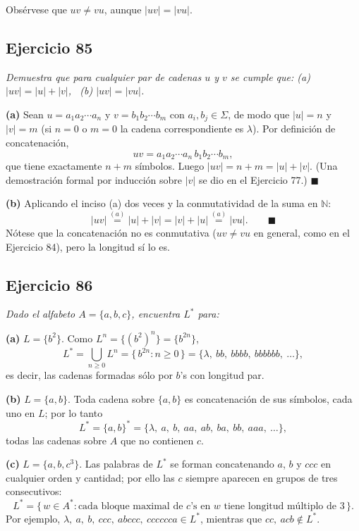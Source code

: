 \noindent Obsérvese que $uv \neq vu$, aunque $|uv| = |vu|$.

\subsection*{Ejercicio 85}

\noindent\textit{Demuestra que para cualquier par de cadenas $u$ y $v$ se cumple
    que: (a) $|uv| = |u| + |v|$, \ (b) $|uv| = |vu|$.}

\medskip
\noindent\textbf{(a)} Sean $u = a_1 a_2 \cdots a_n$ y $v = b_1 b_2 \cdots b_m$ con
$a_i, b_j \in \Sigma$, de modo que $|u| = n$ y $|v| = m$ (si $n = 0$ o $m = 0$ la
cadena correspondiente es $\lambda$). Por definición de concatenación,
\[
uv = a_1 a_2 \cdots a_n\, b_1 b_2 \cdots b_m ,
\]
que tiene exactamente $n + m$ símbolos. Luego $|uv| = n + m = |u| + |v|$.
(Una demostración formal por inducción sobre $|v|$ se dio en el
Ejercicio 77.) $\blacksquare$

\medskip
\noindent\textbf{(b)} Aplicando el inciso (a) dos veces y la conmutatividad de la
suma en $\mathbb{N}$:
\[
|uv| \overset{(a)}{=} |u| + |v| = |v| + |u| \overset{(a)}{=} |vu| . \qquad \blacksquare
\]
Nótese que la concatenación no es conmutativa ($uv \neq vu$ en general, como en el
Ejercicio 84), pero la longitud sí lo es.

\subsection*{Ejercicio 86}

\noindent\textit{Dado el alfabeto $A = \{a, b, c\}$, encuentra $L^*$ para:}

\medskip
\noindent\textbf{(a)} $L = \{b^2\}$. Como $L^n = \{(b^2)^n\} = \{b^{2n}\}$,
\[
L^* = \bigcup_{n \geq 0} L^n = \{\, b^{2n} : n \geq 0 \,\}
= \{\lambda,\ bb,\ bbbb,\ bbbbbb,\ \dots\},
\]
es decir, las cadenas formadas sólo por $b$'s con longitud par.

\medskip
\noindent\textbf{(b)} $L = \{a, b\}$. Toda cadena sobre $\{a,b\}$ es concatenación
de sus símbolos, cada uno en $L$; por lo tanto
\[
L^* = \{a, b\}^* = \{\lambda,\ a,\ b,\ aa,\ ab,\ ba,\ bb,\ aaa,\ \dots\},
\]
todas las cadenas sobre $A$ que no contienen $c$.

\medskip
\noindent\textbf{(c)} $L = \{a, b, c^3\}$. Las palabras de $L^*$ se forman
concatenando $a$, $b$ y $ccc$ en cualquier orden y cantidad; por ello las $c$
siempre aparecen en grupos de tres consecutivos:
\[
L^* = \{\, w \in A^* : \text{cada bloque maximal de } c\text{'s en } w
\text{ tiene longitud múltiplo de } 3 \,\}.
\]
Por ejemplo, $\lambda,\ a,\ b,\ ccc,\ abccc,\ cccccca \in L^*$, mientras que
$cc,\ acb \notin L^*$.

